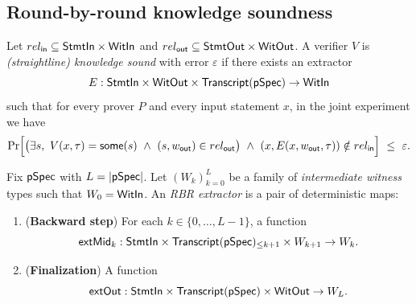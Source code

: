 \subsection{Round-by-round knowledge soundness}

\begin{definition}
Let $rel_{\mathsf{in}} \subseteq \mathsf{StmtIn}\times\mathsf{WitIn}$ and $rel_{\mathsf{out}} \subseteq
\mathsf{StmtOut}\times\mathsf{WitOut}$. A verifier $V$ is \emph{(straightline) knowledge sound} with error
$\varepsilon$ if there exists an extractor
\[
  E : \mathsf{StmtIn} \times \mathsf{WitOut} \times \mathsf{Transcript}(\mathsf{pSpec}) \to \mathsf{WitIn}
\]
such that for every prover $P$ and every input statement $x$, in the joint experiment we have
\[
  \Pr\Bigl[
    \bigl(\exists s,\ V(x,\tau)=\mathsf{some}(s)\ \wedge\ (s,w_{\mathsf{out}})\in rel_{\mathsf{out}}\bigr)
    \ \wedge\
    (x,E(x,w_{\mathsf{out}},\tau)) \notin rel_{\mathsf{in}}
  \Bigr]
  \ \le\ \varepsilon.
\]
\end{definition}

\begin{definition}
Fix $\mathsf{pSpec}$ with $L=|\mathsf{pSpec}|$. Let $(W_k)_{k=0}^{L}$ be a family of \emph{intermediate witness}
types such that $W_0 = \mathsf{WitIn}$. An \emph{RBR extractor} is a pair of deterministic maps:
\begin{enumerate}
  \item (\textbf{Backward step}) For each $k \in \{0,\dots,L-1\}$, a function
  \[
    \mathsf{extMid}_k : \mathsf{StmtIn} \times \mathsf{Transcript}(\mathsf{pSpec})_{\le k+1} \times W_{k+1} \to W_k.
  \]
  \item (\textbf{Finalization}) A function
  \[
    \mathsf{extOut} : \mathsf{StmtIn} \times \mathsf{Transcript}(\mathsf{pSpec}) \times \mathsf{WitOut} \to W_L.
  \]
\end{enumerate}
\end{definition}


